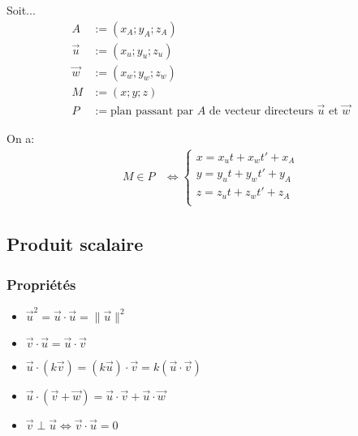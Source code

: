 \documentclass{article}
\newcommand{\R}{\mathds{R}}
\begin{document}
Soit...
\begin{equation*}
    \begin{split}
        A &:= (x_A; y_A; z_A) \\
        \vec u &:= (x_u; y_u; z_u) \\
        \vec w &:= (x_w; y_w; z_w) \\
        M &:= (x; y; z) \\
        P &:= \text{plan passant par $A$ de vecteur directeurs $\vec u$ et $\vec w$}
    \end{split}
\end{equation*}

On a:
\begin{equation*}
    \begin{split}
        M \in P &\iff
        \begin{cases}
            x = x_ut + x_wt' + x_A \\
            y = y_ut + y_wt' + y_A \\
            z = z_ut + z_wt' + z_A \\
        \end{cases}
    \end{split}
\end{equation*}


\subsection{Produit scalaire}
\subsubsection{Propriétés}
\begin{itemize}
	\item $\vec u^2 = \vec u  \cdot \vec u =  \|\vec u\|^2$
	\item $\vec v \cdot \vec u = \vec u \cdot \vec v$
	\item $\vec u \cdot (k\vec v) = (k\vec u) \cdot \vec v = k(\vec u \cdot \vec v)$
	\item $\vec u \cdot (\vec v+\vec w) = \vec u \cdot \vec v + \vec u  \cdot \vec w$
	\item $\vec v \perp \vec u \iff \vec v \cdot \vec u = 0$
\end{itemize}


\end{document}
